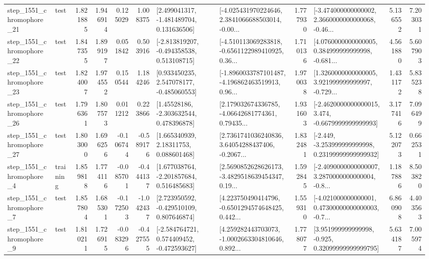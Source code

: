 \begin{tabular}{llrrrrllrlrr}
 step\_1551\_chromophore\_21 &      test &      1.821885 &    1.946914 &      0.125029 &  1.008375 &    [2.499041317, -1.481489704, 0.131636506] &  [-4.025431970224646, 2.3841066688503014, -0.00... &       1.777930 &  [-3.474000000000002, 2.3660000000000068, -0.46... &            5.136552 &          7.203031 \\
 step\_1551\_chromophore\_22 &      test &      1.847355 &    1.899197 &      0.051842 &  0.503916 &   [-2.813819207, -0.494358538, 0.513108715] &  [-4.510113069283818, -0.6561122989410925, 0.36... &       1.710136 &  [4.0760000000000005, 0.384999999999998, -0.681... &            4.561880 &          5.607903 \\
 step\_1551\_chromophore\_23 &      test &      1.824007 &    1.974552 &      0.150544 &  1.184246 &    [0.933450235, 2.547078177, -0.485060553] &  [-1.8960033787101487, -4.196862463519913, 0.96... &       1.970038 &  [1.3260000000000005, 3.921999999999997, -0.729... &            1.431172 &          5.835238 \\
 step\_1551\_chromophore\_26 &      test &      1.796361 &    1.807573 &      0.011212 &  0.223866 &     [1.45528186, -2.303632544, 0.478396878] &  [2.179032674336785, -4.06642681774361, 0.79435... &       1.931603 &  [-2.4620000000000015, 3.474, -0.6679999999999993] &            3.177416 &          7.096499 \\
 step\_1551\_chromophore\_27 &      test &      1.803000 &    1.696256 &     -0.106744 & -0.589176 &      [1.665340939, 2.18311753, 0.088601468] &  [2.7361741036240836, 3.64054288437406, -0.2067... &       1.832481 &  [-2.449, -3.253999999999998, 0.23199999999999932] &            5.122073 &          0.662531 \\
  step\_1551\_chromophore\_4 &  training &      1.859818 &    1.774116 &     -0.085701 & -0.444137 &    [1.677038764, -2.201857684, 0.516485683] &  [2.5690852628626173, -3.4829518639454347, 0.19... &       1.592845 &  [-2.4090000000000007, 3.2870000000000004, -0.8... &            1.187886 &          8.503820 \\
  step\_1551\_chromophore\_7 &      test &      1.857804 &    1.685301 &     -0.172503 & -1.042437 &    [2.723950592, -0.429510109, 0.807646874] &  [4.223750490414796, -0.6501294574648425, 0.442... &       1.559310 &  [-4.021000000000001, 0.47300000000000003, -0.7... &            6.860908 &          4.403563 \\
  step\_1551\_chromophore\_9 &      test &      1.810211 &    1.726915 &     -0.083296 & -0.427555 &   [-2.584764721, 0.574409452, -0.472593627] &  [4.259282443703073, -1.0002663304810646, 0.892... &       1.778077 &   [3.951999999999998, -0.925, 0.32099999999999795] &            5.634187 &          7.005974 \\

\end{tabular}

